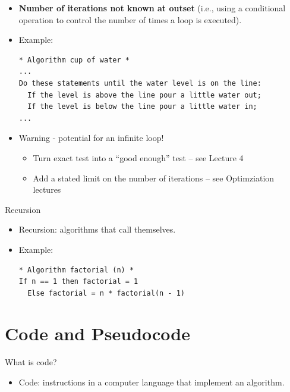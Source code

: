 \documentclass[ignorenonframetext,]{beamer}
\providecommand{\tightlist}{%
  \setlength{\itemsep}{0pt}\setlength{\parskip}{0pt}}
\begin{document}
\begin{frame}[fragile]

\begin{itemize}[<+->]
\item
  \textbf{Number of iterations not known at outset} (i.e., using a
  conditional operation to control the number of times a loop is
  executed).
\item
  Example:

\begin{verbatim}
* Algorithm cup of water *
...
Do these statements until the water level is on the line:
  If the level is above the line pour a little water out;
  If the level is below the line pour a little water in;
...
\end{verbatim}
\item
  Warning - potential for an infinite loop!

  \begin{itemize}[<+->]
  \tightlist
  \item
    Turn exact test into a ``good enough'' test -- see Lecture 4
  \item
    Add a stated limit on the number of iterations -- see Optimziation
    lectures
  \end{itemize}
\end{itemize}

\end{frame}

\begin{frame}[fragile]{Recursion}

\begin{itemize}[<+->]
\item
  Recursion: algorithms that call themselves.
\item
  Example:

\begin{verbatim}
* Algorithm factorial (n) *
If n == 1 then factorial = 1
  Else factorial = n * factorial(n - 1)
\end{verbatim}
\end{itemize}

\end{frame}

\section{Code and Pseudocode}\label{code-and-pseudocode}

\begin{frame}{What is code?}

\begin{itemize}[<+->]
\tightlist
\item
  Code: instructions in a computer language that implement an algorithm.
\end{itemize}

\end{frame}
\end{document}
